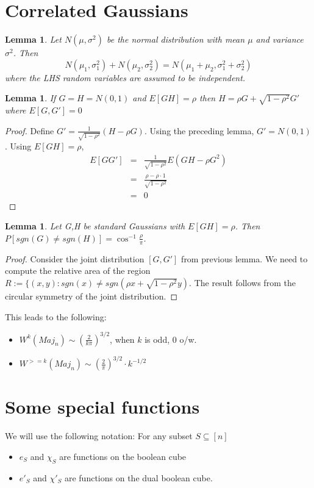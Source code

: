 \documentclass{sig-alternate}
\newtheorem{lemma}[theorem]{Lemma}
\begin{document}
\section{Correlated Gaussians}
\begin{lemma}
Let $N(\mu,\sigma^2)$ be the normal distribution with mean $\mu$ and variance $\sigma^2$. Then \[N(\mu_1,\sigma_1^2) + N(\mu_2, \sigma_2^2) = N(\mu_1 + \mu_2, \sigma_1^2 + \sigma_2^2)\] where the LHS random variables are assumed to be independent.
\end{lemma}

\begin{lemma}
If $G = H = N(0,1)$ and $E[GH] = \rho$ then $H = \rho G + \sqrt{1 - \rho^2}G'$ where $E[G,G'] = 0$
\end{lemma}
\begin{proof}
Define $G' = \frac{1}{\sqrt{1 - \rho^2}}(H - \rho G)$. Using the preceding lemma, $G' = N(0,1)$. Using $E[GH] = \rho$,
\begin{eqnarray*}
E[GG'] & =  & \frac{1}{\sqrt{1 - \rho^2}}E(GH - \rho G^2) \\
 & = & \frac{\rho - \rho \cdot 1}{\sqrt{1 - \rho^2}} \\
 & = & 0
\end{eqnarray*}
\end{proof}

\begin{lemma}
Let G,H be standard Gaussians with $E[GH] = \rho$. Then $P[sgn(G) \neq sgn(H)] = \cos^{-1}\frac{\rho}{\pi}$.
\end{lemma}

\begin{proof}
Consider the joint distribution $[G,G']$ from previous lemma. We need to compute the relative area of the region $R := \{(x,y): sgn(x) \neq sgn(\rho x + \sqrt{1 - \rho^2}y)$. The result follows from the circular symmetry of the joint distribution.
\end{proof}

This leads to the following:
\begin{itemize}
\item $W^k(Maj_n) \sim (\frac{2}{k\pi})^{3/2}$, when $k$ is odd, $0$ o/w.
\item $W^{>=k}(Maj_n) \sim (\frac{2}{\pi})^{3/2} \cdot k^{-1/2}$
\end{itemize}

\section{Some special functions}
\noindent We will use the following notation: For any subset $S \subseteq [n]$
\begin{itemize}
\item $e_S$ and $\chi_S$ are functions on the boolean cube
\item $e'_S$ and $\chi'_S$ are functions on the dual boolean cube.
\end{itemize}
\end{document}
